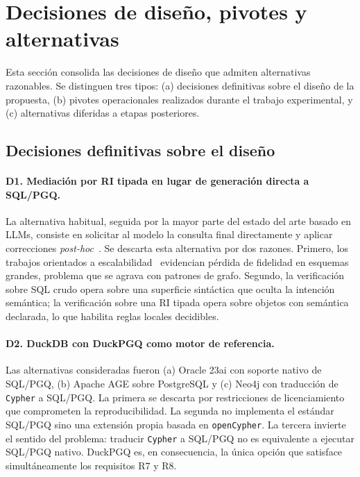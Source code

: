 \section{Decisiones de diseño, pivotes y alternativas}
\label{sec:prop-decisiones}

Esta sección consolida las decisiones de diseño que admiten alternativas razonables. Se distinguen tres tipos: (a) decisiones definitivas sobre el diseño de la propuesta, (b) pivotes operacionales realizados durante el trabajo experimental, y (c) alternativas diferidas a etapas posteriores.

\subsection{Decisiones definitivas sobre el diseño}

\paragraph{D1. Mediación por \ac{RI} tipada en lugar de generación directa a \ac{SQL}/\ac{PGQ}.} La alternativa habitual, seguida por la mayor parte del estado del arte basado en \acp{LLM}, consiste en solicitar al modelo la consulta final directamente y aplicar correcciones \emph{post-hoc}~\cite{DIN-SQL2023, MAC-SQL2023}. Se descarta esta alternativa por dos razones. Primero, los trabajos orientados a escalabilidad~\cite{CRED-SQL2025, RSL-SQL2024} evidencian pérdida de fidelidad en esquemas grandes, problema que se agrava con patrones de grafo. Segundo, la verificación sobre \ac{SQL} crudo opera sobre una superficie sintáctica que oculta la intención semántica; la verificación sobre una \ac{RI} tipada opera sobre objetos con semántica declarada, lo que habilita reglas locales decidibles.

\paragraph{D2. DuckDB con DuckPGQ como motor de referencia.} Las alternativas consideradas fueron (a) Oracle 23ai con soporte nativo de \ac{SQL}/\ac{PGQ}, (b) Apache AGE sobre PostgreSQL y (c) Neo4j con traducción de \texttt{Cypher} a \ac{SQL}/\ac{PGQ}. La primera se descarta por restricciones de licenciamiento que comprometen la reproducibilidad. La segunda no implementa el estándar \ac{SQL}/\ac{PGQ} sino una extensión propia basada en \texttt{openCypher}. La tercera invierte el sentido del problema: traducir \texttt{Cypher} a \ac{SQL}/\ac{PGQ} no es equivalente a ejecutar \ac{SQL}/\ac{PGQ} nativo. DuckPGQ es, en consecuencia, la única opción que satisface simultáneamente los requisitos R7 y R8.

